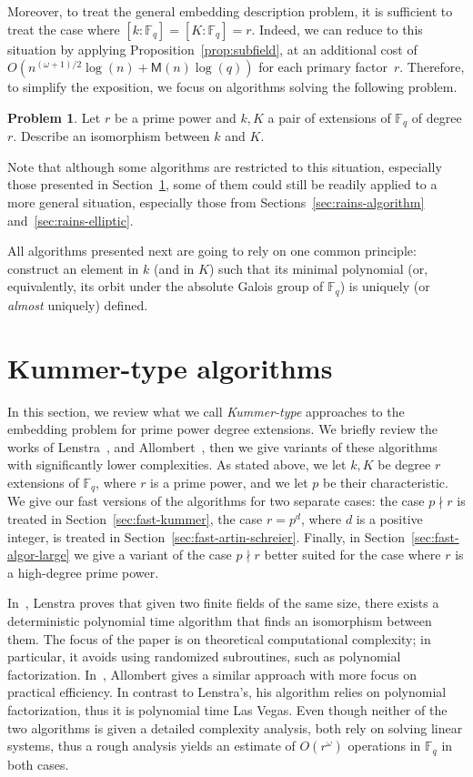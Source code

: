 \documentclass{mcom-l}
\theoremstyle{plain}
\theoremstyle{definition}
\newtheorem*{problem}{Problem}
\newcommand{\F}{\ensuremath{\mathbb{F}}}
\newcommand{\MM}{\ensuremath{\mathsf{M}}}
\newcounter{algorithm}
\begin{document}
Moreover, to treat the general embedding description problem,
it is sufficient to treat the case where $[k:\F_q]=[K:\F_q]=r$.
Indeed, we can reduce to this situation by applying
Proposition~\ref{prop:subfield}, at an additional cost of
$O(n^{(\omega+1)/2}\log(n) + \MM(n)\log(q))$ for each primary factor~$r$.
Therefore, to simplify the exposition, we focus on algorithms
solving the following problem.
\begin{problem}
\label{prob:embedding}
Let $r$ be a prime power and $k, K$ a pair of extensions of $\F_q$
of degree $r$.
Describe an isomorphism between $k$ and $K$.
\end{problem}
Note that although some algorithms are restricted to this situation,
especially those presented in Section~\ref{sec:kummer},
some of them could still be readily applied to a more general situation,
especially those from Sections~\ref{sec:rains-algorithm}
and~\ref{sec:rains-elliptic}.

All algorithms presented next are going to rely on one common
principle: construct an element in $k$ (and in $K$) such that its
minimal polynomial (or, equivalently, its orbit under the absolute
Galois group of $\F_q$) is uniquely (or \emph{almost} uniquely)
defined.

\section{Kummer-type algorithms}
\label{sec:kummer}

In this section, we review what we call \emph{Kummer-type} approaches to the embedding problem for prime power degree extensions. 
We briefly review the works of Lenstra~\cite{LenstraJr91},
and Allombert~\cite{Allombert02,Allombert02-rev}, then 
we give variants of these algorithms with significantly lower complexities.
As stated above, we let $k, K$ be degree $r$ extensions of $\F_q$,
where $r$ is a prime power,
and we let $p$ be their characteristic.
We give our fast versions of the algorithms for two separate cases: the case $p \nmid r$
is treated in Section~\ref{sec:fast-kummer}, the case $r = p^d$, where $d$ 
is a positive integer, is treated in Section~\ref{sec:fast-artin-schreier}.
Finally, in Section~\ref{sec:fast-algor-large} we give a variant of the case
$p \nmid r$ better suited for the case where $r$ is a high-degree prime power.

In~\cite{LenstraJr91}, Lenstra proves that 
given two finite fields of the same size, there exists a deterministic polynomial time algorithm 
that finds an isomorphism between them.
The focus of the paper is on theoretical computational complexity;
in particular, it avoids using randomized subroutines, such as polynomial
factorization. 
In~\cite{Allombert02,Allombert02-rev}, Allombert gives a similar approach with more focus on practical efficiency.
In contrast to Lenstra's, his algorithm relies on polynomial factorization, thus it is
polynomial time Las Vegas.
Even though neither of the two algorithms is given a detailed complexity analysis, both rely
on solving linear systems, thus a rough analysis yields an estimate of $O(r^{\omega})$ operations
in $\F_q$ in both cases.
\end{document}
